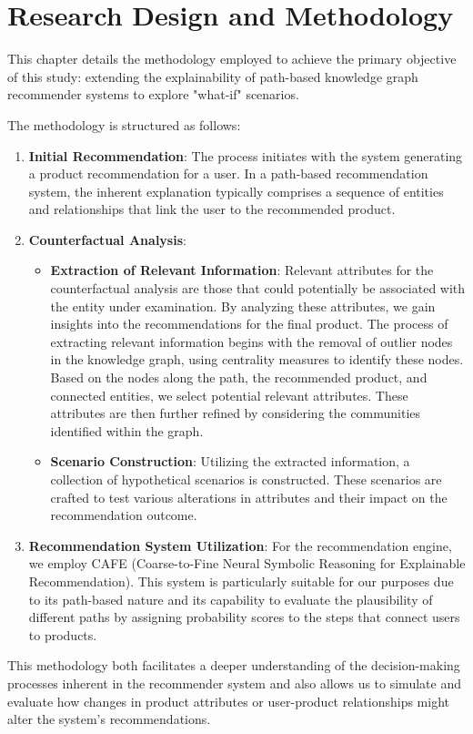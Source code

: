 \chapter{Research Design and Methodology}
\label{chap:methodology} This chapter details the methodology employed to achieve
the primary objective of this study: extending the explainability of path-based
knowledge graph recommender systems to explore "what-if" scenarios.

The methodology is structured as follows:
\begin{enumerate}
	\item \textbf{Initial Recommendation}: The process initiates with the system generating
	      a product recommendation for a user. In a path-based recommendation system, the
	      inherent explanation typically comprises a sequence of entities and relationships
	      that link the user to the recommended product.

	\item \textbf{Counterfactual Analysis}:
	      \begin{itemize}
		      \item \textbf{Extraction of Relevant Information}:
		            Relevant attributes for the counterfactual analysis are those that could
		            potentially be associated with the entity under examination. By analyzing these attributes,
		            we gain insights into the recommendations for the final product. The process of extracting
		            relevant information begins with the removal of outlier nodes in the knowledge graph,
		            using centrality measures to identify these nodes. Based on the nodes along the path,
		            the recommended product, and connected entities, we select potential relevant
		            attributes. These attributes are then further refined by considering the communities
		            identified within the graph.

		      \item \textbf{Scenario Construction}: Utilizing the extracted information,
		            a collection of hypothetical scenarios is constructed. These scenarios are
		            crafted to test various alterations in attributes and their impact on the
		            recommendation outcome.
	      \end{itemize}

	\item \textbf{Recommendation System Utilization}: For the recommendation engine,
	      we employ CAFE (Coarse-to-Fine Neural Symbolic Reasoning for Explainable Recommendation).
	      This system is particularly suitable for our purposes due to its path-based nature
	      and its capability to evaluate the plausibility of different paths by assigning
	      probability scores to the steps that connect users to products.
\end{enumerate}
\vspace{12pt}
This methodology both facilitates a deeper understanding of the decision-making processes
inherent in the recommender system and also allows us to simulate and evaluate how
changes in product attributes or user-product relationships might alter the system's
recommendations.

